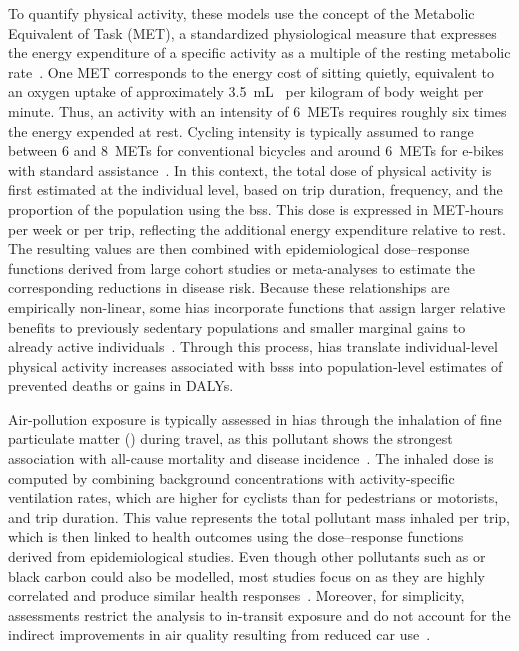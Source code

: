     To quantify physical activity, these models use the concept of the Metabolic Equivalent of Task (MET), a standardized physiological measure that expresses the energy expenditure of a specific activity as a multiple of the resting metabolic rate~\cite{Ainsworth2011}. One MET corresponds to the energy cost of sitting quietly, equivalent to an oxygen uptake of approximately 3.5~\si{\milli\liter}~ per kilogram of body weight per minute. Thus, an activity with an intensity of 6~METs requires roughly six times the energy expended at rest. Cycling intensity is typically assumed to range between 6 and 8~METs for conventional bicycles and around 6~METs for e-bikes with standard assistance~\cite{Rojas-Rueda2011, Woodcock2014, Otero2018, Clockston2021}. In this context, the total dose of physical activity is first estimated at the individual level, based on trip duration, frequency, and the proportion of the population using the \ac{bss}. This dose is expressed in MET-hours per week or per trip, reflecting the additional energy expenditure relative to rest. The resulting values are then combined with epidemiological dose–response functions derived from large cohort studies or meta-analyses to estimate the corresponding reductions in disease risk. Because these relationships are empirically non-linear, some \acp{hia} incorporate functions that assign larger relative benefits to previously sedentary populations and smaller marginal gains to already active individuals~\cite{Otero2018, Clockston2021, Chen2023}. Through this process, \acp{hia} translate individual-level physical activity increases associated with \acp{bss} into population-level estimates of prevented deaths or gains in DALYs.

    Air-pollution exposure is typically assessed in \acp{hia} through the inhalation of fine particulate matter () during travel, as this pollutant shows the strongest association with all-cause mortality and disease incidence~\cite{Woodcock2014, Otero2018, Clockston2021, Cao2021}. The inhaled dose is computed by combining background  concentrations with activity-specific ventilation rates, which are higher for cyclists than for pedestrians or motorists, and trip duration. This value represents the total pollutant mass inhaled per trip, which is then linked to health outcomes using the dose–response functions derived from epidemiological studies. Even though other pollutants such as  or black carbon could also be modelled, most studies focus on  as they are highly correlated and produce similar health responses~\cite{Otero2018}. Moreover, for simplicity, assessments restrict the analysis to in-transit exposure and do not account for the indirect improvements in air quality resulting from reduced car use~\cite{Clockston2021}. 

